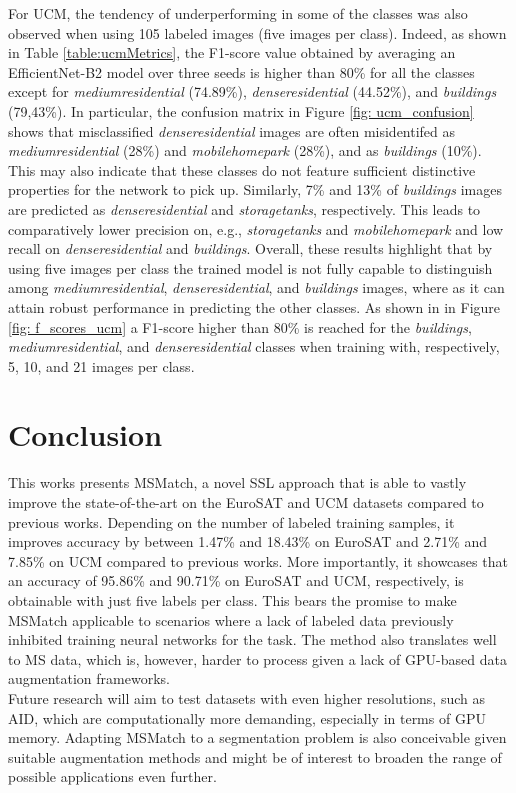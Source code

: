 \documentclass[journal]{IEEEtran}
\begin{document}
For UCM, the tendency of underperforming in some of the classes was also observed when using 105 labeled images (five images per class). Indeed, as shown in Table \ref{table:ucmMetrics}, the F1-score value obtained by averaging an EfficientNet-B2 model over three seeds is higher than 80\% for all the classes except for \textit{mediumresidential} (74.89\%), \textit{denseresidential} (44.52\%), and \textit{buildings} (79,43\%). In particular, the confusion matrix in Figure \ref{fig: ucm_confusion} shows that misclassified \textit{denseresidential} images are often misidentifed as \textit{mediumresidential} (28\%) and \textit{mobilehomepark} (28\%), and as \textit{buildings} (10\%). This may also indicate that these classes do not feature sufficient distinctive properties for the network to pick up. Similarly, 7\% and 13\% of \textit{buildings} images are predicted as \textit{denseresidential} and \textit{storagetanks}, respectively. This leads to comparatively lower precision on, e.g., \textit{storagetanks} and \textit{mobilehomepark} and low recall on \textit{denseresidential} and \textit{buildings}. Overall, these results highlight that by using five images per class the trained model is not fully capable to distinguish among \textit{mediumresidential},  \textit{denseresidential}, and \textit{buildings} images, where as it can attain robust performance in predicting the other classes. As shown in in Figure \ref{fig: f_scores_ucm} a F1-score higher than 80\% is reached for the \textit{buildings}, \textit{mediumresidential}, and \textit{denseresidential}  classes when training with, respectively, 5, 10, and 21 images per class.

\section{Conclusion}
This works presents MSMatch, a novel SSL approach that is able to vastly improve the state-of-the-art on the EuroSAT and UCM datasets compared to previous works. Depending on the number of labeled training samples, it improves accuracy by between 1.47\% and 18.43\% on EuroSAT and 2.71\% and 7.85\% on UCM compared to previous works. More importantly, it showcases that an accuracy of 95.86\% and 90.71\% on EuroSAT and UCM, respectively, is obtainable with just five labels per class. This bears the promise to make MSMatch applicable to scenarios where a lack of labeled data previously inhibited training neural networks for the task. The method also translates well to MS data, which is, however, harder to process given a lack of GPU-based data augmentation frameworks. \\
Future research will aim to test datasets with even higher resolutions, such as AID, which are computationally more demanding, especially in terms of GPU memory. Adapting MSMatch to a segmentation problem is also conceivable given suitable augmentation methods and might be of interest to broaden the range of possible applications even further. 
\end{document}
